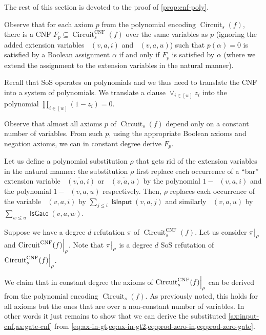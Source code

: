 \documentclass[10pt,a4paper]{article}
\theoremstyle{plain}
\theoremstyle{remark}
\theoremstyle{definition}
\newcommand{\pa}[1]{}
\newcommand{\kr}[1]{}
\newcommand\restrict[2]{{%
  \left.\kern-\nulldelimiterspace %
  #1 %
  \vphantom{\big|} %
  \right|_{#2} %
  }}
\newcommand{\vars}[1]{\mathsf{#1}}
\DeclareMathOperator{\circuit}{Circuit}
\DeclareMathOperator{\isvar}{\vars{IsInput}}
\DeclareMathOperator{\isgate}{\vars{IsGate}}
\DeclareMathOperator{\isvarless}{\vars{IsInput^{\le}}}
\DeclareMathOperator{\isgateless}{\vars{IsGate^{\le}}}
\begin{document}
The rest of this section is devoted to the proof of
\cref{prop:cnf-poly}.

Observe that for each axiom $p$ from the polynomial encoding
$\circuit_s(f)$, there is a CNF
$F_p \subseteq \circuit_s^{\mathrm{CNF}}(f)$ over the same variables
as $p$ (ignoring the added extension variables $\isvarless(v, a, i)$
and $\isgateless(v, a, u)$) such that $p(\alpha) = 0$ is satisfied by
a Boolean assignment $\alpha$ if and only if $F_p$ is satisfied by
$\alpha$ (where we extend the assignment to the extension variables in
the natural manner).

\pa{``extension variables'' not defined.  When introducing them, say
  that they are extension variables, and remind here what the
  extension variables are.  But I also don't understand what the
  purpose of this paragraph is, why is it needed?}

\kr{added the definition of extension variables and remind the reader
  by adding the names. The purpose of this paragraph is to introduce
  the notation $F_p$.}

Recall that SoS operates on polynomials and we thus need to translate
the CNF into a system of polynomials. We translate a clause
$\vee_{i \in [w]} z_i$ into the polynomial
$\prod_{i \in [w]}(1 - z_i) = 0$.

Observe that almost all axioms $p$ of $\circuit_s(f)$ depend only on a
constant number of variables. From such $p$, using the appropriate
Boolean axioms and negation axioms, we can in constant degree derive
$F_p$.

Let us define a polynomial substitution $\rho$ that gets rid of the
extension variables in the natural manner: the substitution $\rho$
first replace each occurrence of a ``bar'' extension variable
$\overline{\isvarless(v, a, i)}$ or $\overline{\isgateless(v, a, u)}$
by the polynomial $1-\isvarless(v, a, i)$ and the polynomial
$1-\isgateless(v, a, u)$ respectively. Then, $\rho$ replaces each
occurrence of the variable $\isvarless(v, a, i)$ by
$\sum_{j \le i} \isvar(v, a, j)$ and similarly $\isgateless(v, a, u)$
by $\sum_{w \le u} \isgate(v, a, w)$.

Suppose we have a degree $d$ refutation $\pi$ of
$\circuit_s^{\mathrm{CNF}}(f)$. Let us consider $\restrict{\pi}{\rho}$
and $\restrict{\circuit^{\mathrm{CNF}}(f)}{\rho}$. Note that
$\restrict{\pi}{\rho}$ is a degree $d$ SoS refutation of
$\restrict{\circuit^{\mathrm{CNF}}_s(f)}{\rho}$.

We claim that in constant degree the axioms of
$\restrict{\circuit^{\mathrm{CNF}}_s(f)}{\rho}$ can be derived from the
polynomial encoding $\circuit_s(f)$. As previously noted, this holds
for all axioms but the ones that are over a non-constant number of
variables. In other words it just remains to show that we can derive
the substituted \cref{ax:input-cnf,ax:gate-cnf} from
\cref{eq:ax-in-gt,eq:ax-in-gt2,eq:prod-zero-in,eq:prod-zero-gate}.
\end{document}
